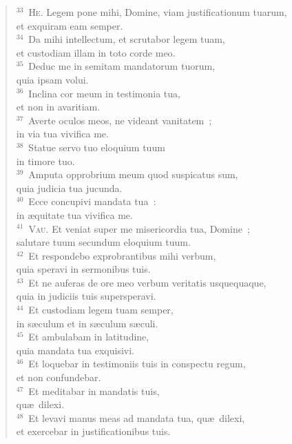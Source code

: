 \begin{flushleft}
\begin{verse}
${}^{33}$~\textsc{He.} Legem pone mihi, Domine, viam justificationum tuarum,\\ et exquiram eam semper.\\
${}^{34}$~Da mihi intellectum, et scrutabor legem tuam,\\ et custodiam illam in toto corde meo.\\
${}^{35}$~Deduc me in semitam mandatorum tuorum,\\ quia ipsam volui.\\
${}^{36}$~Inclina cor meum in testimonia tua,\\ et non in avaritiam.\\
${}^{37}$~Averte oculos meos, ne videant vanitatem~;\\ in via tua vivifica me.\\
${}^{38}$~Statue servo tuo eloquium tuum\\ in timore tuo.\\
${}^{39}$~Amputa opprobrium meum quod suspicatus sum,\\ quia judicia tua jucunda.\\
${}^{40}$~Ecce concupivi mandata tua~:\\ in \ae quitate tua vivifica me.\\
${}^{41}$~\textsc{Vau.} Et veniat super me misericordia tua, Domine~;\\ salutare tuum secundum eloquium tuum.\\
${}^{42}$~Et respondebo exprobrantibus mihi verbum,\\ quia speravi in sermonibus tuis.\\
${}^{43}$~Et ne auferas de ore meo verbum veritatis usquequaque,\\ quia in judiciis tuis supersperavi.\\
${}^{44}$~Et custodiam legem tuam semper,\\ in s\ae culum et in s\ae culum s\ae culi.\\
${}^{45}$~Et ambulabam in latitudine,\\ quia mandata tua exquisivi.\\
${}^{46}$~Et loquebar in testimoniis tuis in conspectu regum,\\ et non confundebar.\\
${}^{47}$~Et meditabar in mandatis tuis,\\ qu\ae\ dilexi.\\
${}^{48}$~Et levavi manus meas ad mandata tua, qu\ae\ dilexi,\\ et exercebar in justificationibus tuis.\\

\end{verse}
\end{flushleft}

